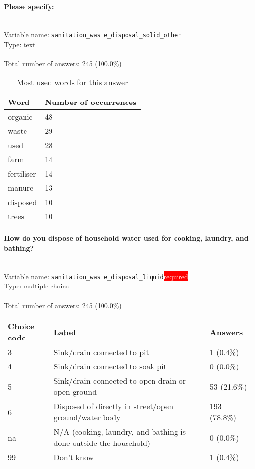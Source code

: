 \documentclass[11.5pt, a4paper]{scrartcl}
\begin{document}
\paragraph{Please specify:}
\  \\Variable name: \texttt{sanitation\_waste\_disposal\_solid\_other}\\
Type: text\\
\\Total number of answers: 245 (100.0\%)
\\[0.2em]\begin{table}[H]
 \begin{tabular}{p{4cm}|p{8cm}}
Word & Number of occurrences  \\
\hline
\cellcolor{mygray}organic&\cellcolor{mygray}48\\
\hline
waste&29\\
\hline
\cellcolor{mygray}used&\cellcolor{mygray}28\\
\hline
farm&14\\
\hline
\cellcolor{mygray}fertiliser&\cellcolor{mygray}14\\
\hline
manure&13\\
\hline
\cellcolor{mygray}disposed&\cellcolor{mygray}10\\
\hline
trees&10\\
\hline
\end{tabular}
\caption{\label{tab:table-name} Most used words for this answer}
\end{table}
\paragraph{How do you dispose of household water used for cooking, laundry, and bathing? }
\  \\Variable name: \texttt{sanitation\_waste\_disposal\_liquid}\hfill\colorbox{red}{\small{\textcolor{white}{required}}}\\
 Type: multiple choice\\
\\Total number of answers: 245 (100.0\%)
\\[0.2em] \begin{tabular}{p{4cm}|p{8cm}|p{3cm}}
Choice code & Label & Answers \\
\hline
3 & Sink/drain connected to pit & \cellcolor{color0}1 (0.4\%)\\
\cellcolor{mygray} 4 & \cellcolor{mygray}Sink/drain connected to soak pit  & \cellcolor{color0}0 (0.0\%)\\
5 & Sink/drain connected to open drain or open ground & \cellcolor{color1}53 (21.6\%)\\
\cellcolor{mygray} 6 & \cellcolor{mygray}Disposed of directly in street/open ground/water body  & \cellcolor{color3}193 (78.8\%)\\
na & N/A (cooking, laundry, and bathing is done outside the household) & \cellcolor{color0}0 (0.0\%)\\
\cellcolor{mygray} 99 & \cellcolor{mygray}Don’t know  & \cellcolor{color0}1 (0.4\%)\\
\end{tabular}
\end{document}
